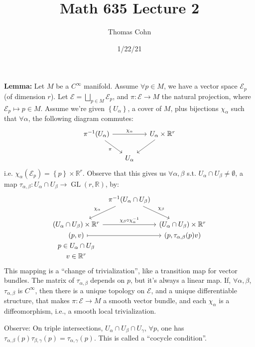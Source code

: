 \documentclass[10pt,letterpaper]{article}
\author{Thomas Cohn}
\title{Math 635 Lecture 2}
\date{1/22/21} %
\newcommand{\n}{\hfill\break}
\newcommand{\nn}{\vspace{0.5\baselineskip}\n}
\newcommand{\hangblock}[2]{\par\noindent\settowidth{\hangindent}{\textbf{#1: }}\textbf{#1: }\nolinebreak#2}
\newcommand{\lemma}[1]{\hangblock{Lemma}{#1}}
\newcommand{\set}[1]{\left\{#1\right\}}
\newcommand{\reals}{\mathbb{R}}
\newcommand{\R}{\reals}
\newcommand{\inv}{^{-1}}
\newcommand{\of}{\circ}
\DeclareMathOperator{\GL}{GL}
\newcommand{\st}{s.t.}
\begin{document}
\maketitle
\setlength\RaggedRightParindent{\parindent}
\RaggedRight

\lemma{
	Let $M$ be a $C^{\infty}$ manifold. Assume $\forall{}p\in{}M$, we have a vector space $\mathcal{E}_{p}$ (of dimension $r$). Let $\mathcal{E}=\bigsqcup_{p\in{}M}\mathcal{E}_{p}$, and $\pi:\mathcal{E}\to{}M$ the natural projection, where $\mathcal{E}_{p}\mapsto{}p\in{}M$. Assume we're given $\set{U_{\alpha}}$, a cover of $M$, plus bijections $\chi_{\alpha}$ such that $\forall\alpha$, the following diagram commutes:
	\[
		\begin{tikzcd}[ampersand replacement=\&]
			\pi\inv(U_{\alpha}) \arrow[rr,"\chi_{\alpha}"] \arrow[dr, "\pi", swap] \&[-10pt] \&[-10pt] U_{\alpha}\times\R^{r} \arrow[dl]\\
			\& U_{\alpha}
		\end{tikzcd}
	\]
	i.e. $\chi_{\alpha}(\mathcal{E}_{p})=\set{p}\times\R^{r}$.\nn
	Observe that this gives us $\forall\alpha,\beta$ \st{} $U_{\alpha}\cap{}U_{\beta}\ne\emptyset$, a map $\tau_{\alpha,\beta}:U_{\alpha}\cap{}U_{\beta}\to\GL(r,\R)$, by:
	\[
		\begin{tikzcd}[ampersand replacement=\&]
			\&[-20pt] \pi\inv(U_{\alpha}\cap{}U_{\beta}) \arrow[dl, "\chi_{\alpha}", swap] \arrow[dr, "\chi_{\beta}"] \&[-20pt]\\
			(U_{\alpha}\cap{}U_{\beta})\times\R^{r} \arrow[rr,"\chi_{\beta}\of\chi_{\alpha}\inv"] \& \& (U_{\alpha}\cap{}U_{\beta})\times\R^{r}\\[-20pt]
			(p,v) \arrow[rr,mapsto] \& \& (p,\tau_{\alpha,\beta}(p)v)\\[-20pt]
			p\in{}U_{\alpha}\cap{}U_{\beta}\\[-20pt]
			v\in\R^{r}
		\end{tikzcd}
	\]
	This mapping is a ``change of trivialization'', like a transition map for vector bundles. The matrix of $\tau_{\alpha,\beta}$ depends on $p$, but it's always a linear map.\nn
	If, $\forall\alpha,\beta$, $\tau_{\alpha,\beta}$ is $C^{\infty}$, then there is a unique topology on $\mathcal{E}$, and a unique differentiable structure, that makes $\pi:\mathcal{E}\to{}M$ a smooth vector bundle, and each $\chi_{\alpha}$ is a diffeomorphism, i.e., a smooth local trivialization.\n
}

\par\noindent
Observe: On triple intersections, $U_{\alpha}\cap{}U_{\beta}\cap{}U_{\gamma}$, $\forall{}p$, one has $\tau_{\alpha,\beta}(p)\tau_{\beta,\gamma}(p)=\tau_{\alpha,\gamma}(p)$. This is called a ``cocycle condition''.\n
\end{document}
